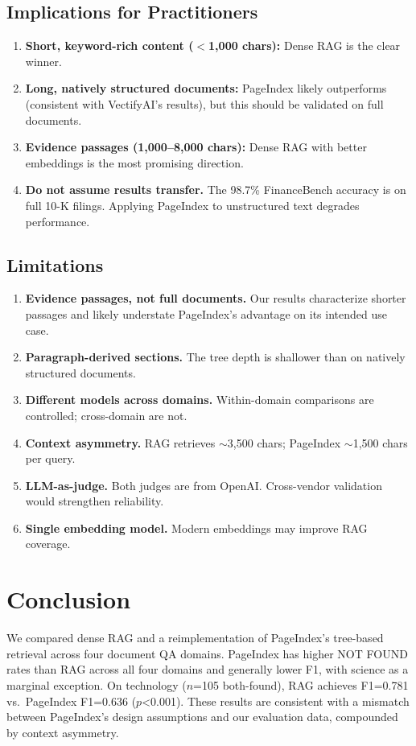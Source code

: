 \documentclass[journal]{IEEEtran}
\begin{document}
\subsection{Implications for Practitioners}
\begin{enumerate}
\item \textbf{Short, keyword-rich content ($<$1,000 chars):} Dense RAG is the clear winner.
\item \textbf{Long, natively structured documents:} PageIndex likely outperforms (consistent with VectifyAI's results), but this should be validated on full documents.
\item \textbf{Evidence passages (1,000--8,000 chars):} Dense RAG with better embeddings is the most promising direction.
\item \textbf{Do not assume results transfer.} The 98.7\% FinanceBench accuracy is on full 10-K filings. Applying PageIndex to unstructured text degrades performance.
\end{enumerate}

\subsection{Limitations}
\begin{enumerate}
\item \textbf{Evidence passages, not full documents.} Our results characterize shorter passages and likely understate PageIndex's advantage on its intended use case.
\item \textbf{Paragraph-derived sections.} The tree depth is shallower than on natively structured documents.
\item \textbf{Different models across domains.} Within-domain comparisons are controlled; cross-domain are not.
\item \textbf{Context asymmetry.} RAG retrieves $\sim$3,500 chars; PageIndex $\sim$1,500 chars per query.
\item \textbf{LLM-as-judge.} Both judges are from OpenAI. Cross-vendor validation would strengthen reliability.
\item \textbf{Single embedding model.} Modern embeddings may improve RAG coverage.
\end{enumerate}


\section{Conclusion}
\label{sec:conclusion}

We compared dense RAG and a reimplementation of PageIndex's tree-based retrieval across four document QA domains. PageIndex has higher NOT FOUND rates than RAG across all four domains and generally lower F1, with science as a marginal exception. On technology ($n$=105 both-found), RAG achieves F1=0.781 vs.\ PageIndex F1=0.636 ($p$<0.001). These results are consistent with a mismatch between PageIndex's design assumptions and our evaluation data, compounded by context asymmetry.
\end{document}
